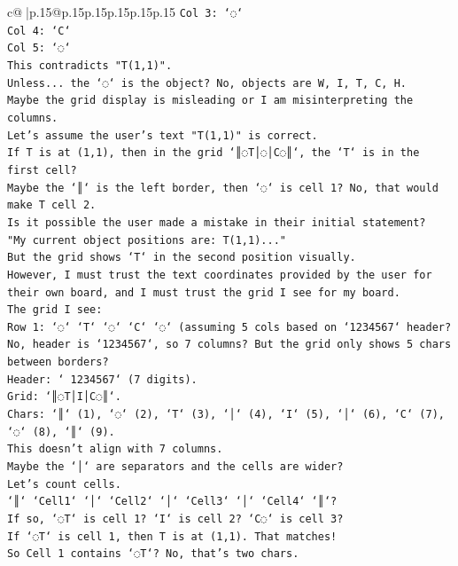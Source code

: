 \documentclass{article}
\begin{document}
{\begin{supertabular}{c@{$\;$}|p{.15\linewidth}@{}p{.15\linewidth}p{.15\linewidth}p{.15\linewidth}p{.15\linewidth}p{.15\linewidth}}
{{{\texttt{Col 3: `◌`} \\
\texttt{Col 4: `C`} \\
\texttt{Col 5: `◌`} \\
\texttt{This contradicts "T(1,1)".} \\
\texttt{Unless... the `◌` is the object? No, objects are W, I, T, C, H.} \\
\texttt{Maybe the grid display is misleading or I am misinterpreting the columns.} \\
\texttt{Let's assume the user's text "T(1,1)" is correct.} \\
\texttt{If T is at (1,1), then in the grid `║◌T│◌│C◌║`, the `T` is in the first cell?} \\
\texttt{Maybe the `║` is the left border, then `◌` is cell 1? No, that would make T cell 2.} \\
\texttt{Is it possible the user made a mistake in their initial statement?} \\
\texttt{"My current object positions are: T(1,1)..."} \\
\texttt{But the grid shows `T` in the second position visually.} \\
\texttt{However, I must trust the text coordinates provided by the user for their own board, and I must trust the grid I see for my board.} \\
\texttt{The grid I see:} \\
\texttt{Row 1: `◌` `T` `◌` `C` `◌` (assuming 5 cols based on `1234567` header? No, header is `1234567`, so 7 columns? But the grid only shows 5 chars between borders?} \\
\texttt{Header: ` 1234567` (7 digits).} \\
\texttt{Grid: `║◌T│I│C◌║`.} \\
\texttt{Chars: `║` (1), `◌` (2), `T` (3), `│` (4), `I` (5), `│` (6), `C` (7), `◌` (8), `║` (9).} \\
\texttt{This doesn't align with 7 columns.} \\
\texttt{Maybe the `│` are separators and the cells are wider?} \\
\texttt{Let's count cells.} \\
\texttt{`║` `Cell1` `│` `Cell2` `│` `Cell3` `│` `Cell4` `║`?} \\
\texttt{If so, `◌T` is cell 1? `I` is cell 2? `C◌` is cell 3?} \\
\texttt{If `◌T` is cell 1, then T is at (1,1). That matches!} \\
\texttt{So Cell 1 contains `◌T`? No, that's two chars.} \\
}}}
\end{supertabular}}
\end{document}
